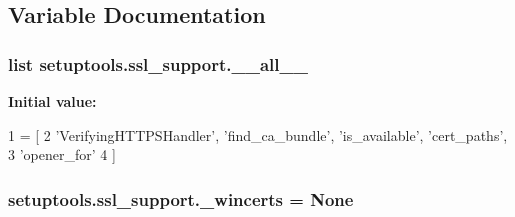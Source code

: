 \subsection{Variable Documentation}
\hypertarget{namespacesetuptools_1_1ssl__support_ad9834cffaa5a18aa4ee561b6fc6fd9c6}{}
\subsubsection[{\+\_\+\+\_\+all\+\_\+\+\_\+}]{\setlength{\rightskip}{0pt plus 5cm}list setuptools.\+ssl\+\_\+support.\+\_\+\+\_\+all\+\_\+\+\_\+}\label{namespacesetuptools_1_1ssl__support_ad9834cffaa5a18aa4ee561b6fc6fd9c6}
{\bfseries Initial value\+:}
\begin{DoxyCode}
1 = [
2     \textcolor{stringliteral}{'VerifyingHTTPSHandler'}, \textcolor{stringliteral}{'find\_ca\_bundle'}, \textcolor{stringliteral}{'is\_available'}, \textcolor{stringliteral}{'cert\_paths'},
3     \textcolor{stringliteral}{'opener\_for'}
4 ]
\end{DoxyCode}
\hypertarget{namespacesetuptools_1_1ssl__support_ab469239b315e811781c21bb0cc23af78}{}
\subsubsection[{\+\_\+wincerts}]{\setlength{\rightskip}{0pt plus 5cm}setuptools.\+ssl\+\_\+support.\+\_\+wincerts = None}\label{namespacesetuptools_1_1ssl__support_ab469239b315e811781c21bb0cc23af78}
\hypertarget{namespacesetuptools_1_1ssl__support_a3b596fad36adc8396fb3eebc33b00cda}{}
